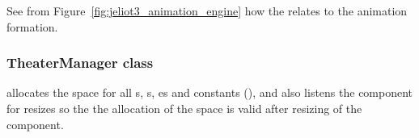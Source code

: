 See from Figure~\ref{fig:jeliot3_animation_engine} how the  relates to the animation formation.

\subsubsection{TheaterManager class}

 allocates the space for all s, s, \-es and constants (), and also listens the  component for resizes so the the allocation of the space is valid after resizing of the  component.
